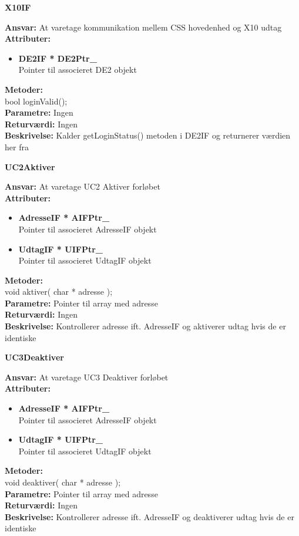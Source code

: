 %
%
{\centering
\textbf{X10IF}\par
}
\textbf{Ansvar:} At varetage kommunikation mellem CSS hovedenhed og X10 udtag \\
\textbf{Attributer:}
\begin{itemize}
	\item \textbf{DE2IF * DE2Ptr\_} \\
	Pointer til associeret DE2 objekt
\end{itemize}
\textbf{Metoder:} \\
bool loginValid(); \\
\textbf{Parametre:} Ingen \\
\textbf{Returværdi:} Ingen \\
\textbf{Beskrivelse:} Kalder getLoginStatus() metoden i DE2IF og returnerer værdien her fra \\

%
%
{\centering
\textbf{UC2Aktiver}\par
}
\textbf{Ansvar:} At varetage UC2 Aktiver forløbet \\
\textbf{Attributer:}
\begin{itemize}
	\item \textbf{AdresseIF * AIFPtr\_} \\
	Pointer til associeret AdresseIF objekt
	\item \textbf{UdtagIF * UIFPtr\_} \\
	Pointer til associeret UdtagIF objekt
\end{itemize}
\textbf{Metoder:} \\
void aktiver( char * adresse ); \\
\textbf{Parametre:} Pointer til array med adresse \\
\textbf{Returværdi:} Ingen \\
\textbf{Beskrivelse:} Kontrollerer adresse ift. AdresseIF og aktiverer udtag hvis de er identiske \\

%
%
{\centering
\textbf{UC3Deaktiver}\par
}
\textbf{Ansvar:} At varetage UC3 Deaktiver forløbet \\
\textbf{Attributer:}
\begin{itemize}
	\item \textbf{AdresseIF * AIFPtr\_} \\
	Pointer til associeret AdresseIF objekt
	\item \textbf{UdtagIF * UIFPtr\_} \\
	Pointer til associeret UdtagIF objekt
\end{itemize}
\textbf{Metoder:} \\
void deaktiver( char * adresse ); \\
\textbf{Parametre:} Pointer til array med adresse \\
\textbf{Returværdi:} Ingen \\
\textbf{Beskrivelse:} Kontrollerer adresse ift. AdresseIF og deaktiverer udtag hvis de er identiske \\

